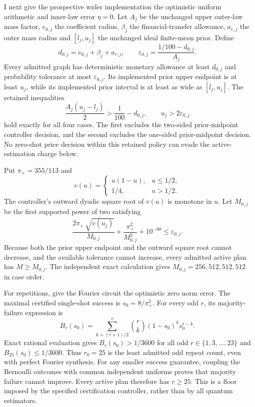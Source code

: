 I next give the prospective wider implementation the optimistic uniform
arithmetic and inner-law error $\eta=0$. Let $A_j$ be the unchanged
upper outer-law mass factor, $e_{0,j}$ the coefficient radius,
$\beta_j$ the financial-transfer allowance, $a_{r,j}$ the outer
mass radius and $[l_j,u_j]$ the unchanged ideal finite-mean prior.
Define
\begin{equation}
 d_{0,j}=e_{0,j}+\beta_j+a_{r,j},\qquad
 \varepsilon_{0,j}=\frac{1/100-d_{0,j}}{A_j}.
\end{equation}
Every admitted graph has deterministic monetary allowance at least
$d_{0,j}$ and probability tolerance at most $\varepsilon_{0,j}$.
Its implemented prior upper endpoint is at least $u_j$, while its
implemented prior interval is at least as wide as $[l_j,u_j]$.
The retained inequalities
\begin{equation}
 \frac{A_j(u_j-l_j)}2>\frac1{100}-d_{0,j},\qquad
 u_j>2\varepsilon_{0,j}
\label{eq:raw-asymmetric-zero-shot-exclusions}
\end{equation}
hold exactly for all four cases. The first excludes the two-sided
prior-midpoint controller decision, and the second excludes the
one-sided prior-midpoint decision. No zero-shot price decision within
this retained policy can evade the active-estimation charge below.

Put $\pi_+=355/113$ and
\begin{equation}
 v(u)=\begin{cases}u(1-u),&u\leq1/2,\\1/4,&u>1/2.\end{cases}
\end{equation}
The controller's outward dyadic square root of $v(u)$ is monotone in
$u$. Let $M_{0,j}$ be the first supported power of two satisfying
\begin{equation}
 \frac{2\pi_+\,\overline{\sqrt{v(u_j)}}}{M_{0,j}}
       +\frac{\pi_+^2}{M_{0,j}^2}+10^{-60}
       \leq\varepsilon_{0,j}.
\end{equation}
Because both the prior upper endpoint and the outward square root
cannot decrease, and the available tolerance cannot increase, every
admitted active plan has $M\geq M_{0,j}$. The independent exact
calculation gives $M_{0,j}=256,512,512,512$ in case order.

For repetitions, give the Fourier circuit the optimistic zero norm
error. The maximal certified single-shot success is
$s_0=8/\pi_+^2$. For every odd $r$, its majority-failure expression is
\begin{equation}
 B_r(s_0)=\sum_{k=(r+1)/2}^{r}\binom rk(1-s_0)^ks_0^{r-k}.
\end{equation}
Exact rational evaluation gives $B_r(s_0)>1/3600$ for all odd
$r\in\{1,3,\ldots,23\}$ and $B_{25}(s_0)\leq1/3600$.
Thus $r_0=25$ is the least admitted odd repeat count, even with perfect
Fourier synthesis. For any smaller success guarantee, coupling the
Bernoulli outcomes with common independent uniforms proves that
majority failure cannot improve. Every active plan therefore has
$r\geq25$. This is a floor imposed by the specified certification
controller, rather than by all quantum estimators.

